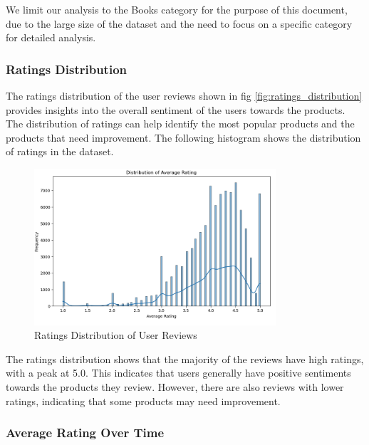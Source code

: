 \documentclass{article}
\begin{document}
We limit our analysis to the Books category for the purpose of this document, due to the large size of the dataset and the need to focus on a specific category for detailed analysis.

\subsubsection{Ratings Distribution}

The ratings distribution of the user reviews shown in fig \autoref{fig:ratings_distribution}  provides insights into the overall sentiment of the users towards the products. The distribution of ratings can help identify the most popular products and the products that need improvement. The following histogram shows the distribution of ratings in the dataset.

\begin{figure}[H]
\centering
\includegraphics[width=0.8\textwidth]{img/avg_rating.png}
\caption{Ratings Distribution of User Reviews}
\label{fig:ratings_distribution}
\end{figure}

The ratings distribution shows that the majority of the reviews have high ratings, with a peak at 5.0. This indicates that users generally have positive sentiments towards the products they review. However, there are also reviews with lower ratings, indicating that some products may need improvement.

\subsubsection{Average Rating Over Time}
\end{document}
